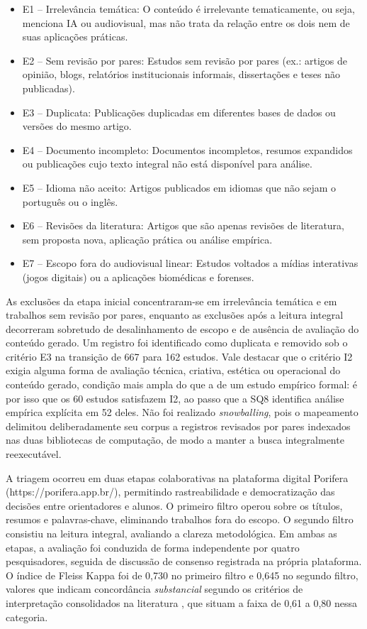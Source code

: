 \begin{itemize}
    \item E1 – Irrelevância temática: O conteúdo é irrelevante tematicamente, ou seja, menciona IA ou audiovisual, mas não trata da relação entre os dois nem de suas aplicações práticas.
    \item E2 – Sem revisão por pares: Estudos sem revisão por pares (ex.: artigos de opinião, blogs, relatórios institucionais informais, dissertações e teses não publicadas).
    \item E3 – Duplicata: Publicações duplicadas em diferentes bases de dados ou versões do mesmo artigo.
    \item E4 – Documento incompleto: Documentos incompletos, resumos expandidos ou publicações cujo texto integral não está disponível para análise.
    \item E5 – Idioma não aceito: Artigos publicados em idiomas que não sejam o português ou o inglês.
    \item E6 – Revisões da literatura: Artigos que são apenas revisões de literatura, sem proposta nova, aplicação prática ou análise empírica.
    \item E7 – Escopo fora do audiovisual linear: Estudos voltados a mídias interativas (jogos digitais) ou a aplicações biomédicas e forenses.
\end{itemize}

As exclusões da etapa inicial concentraram-se em irrelevância temática e em trabalhos sem revisão por pares, enquanto as exclusões após a leitura integral decorreram sobretudo de desalinhamento de escopo e de ausência de avaliação do conteúdo gerado. Um registro foi identificado como duplicata e removido sob o critério E3 na transição de 667 para 162 estudos. Vale destacar que o critério I2 exigia alguma forma de avaliação técnica, criativa, estética ou operacional do conteúdo gerado, condição mais ampla do que a de um estudo empírico formal: é por isso que os 60 estudos satisfazem I2, ao passo que a SQ8 identifica análise empírica explícita em 52 deles. Não foi realizado \textit{snowballing}, pois o mapeamento delimitou deliberadamente seu corpus a registros revisados por pares indexados nas duas bibliotecas de computação, de modo a manter a busca integralmente reexecutável.

A triagem ocorreu em duas etapas colaborativas na plataforma digital Porifera \citep{campos2022porifera} (https://porifera.app.br/), permitindo rastreabilidade e democratização das decisões entre orientadores e alunos. O primeiro filtro operou sobre os títulos, resumos e palavras-chave, eliminando trabalhos fora do escopo. O segundo filtro consistiu na leitura integral, avaliando a clareza metodológica. Em ambas as etapas, a avaliação foi conduzida de forma independente por quatro pesquisadores, seguida de discussão de consenso registrada na própria plataforma. O índice de Fleiss Kappa \citep{fleiss1971} foi de 0,730 no primeiro filtro e 0,645 no segundo filtro, valores que indicam concordância \textit{substancial} segundo os critérios de interpretação consolidados na literatura \citep{landis1977measurement}, que situam a faixa de 0,61 a 0,80 nessa categoria.

